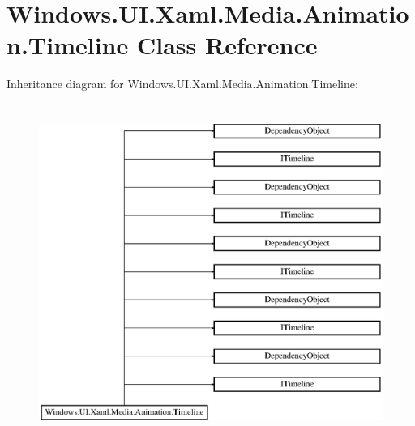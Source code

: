 \hypertarget{class_windows_1_1_u_i_1_1_xaml_1_1_media_1_1_animation_1_1_timeline}{}\section{Windows.\+U\+I.\+Xaml.\+Media.\+Animation.\+Timeline Class Reference}
\label{class_windows_1_1_u_i_1_1_xaml_1_1_media_1_1_animation_1_1_timeline}
Inheritance diagram for Windows.\+U\+I.\+Xaml.\+Media.\+Animation.\+Timeline\+:\begin{figure}[H]
\begin{center}
\leavevmode
\includegraphics[height=11.000000cm]{class_windows_1_1_u_i_1_1_xaml_1_1_media_1_1_animation_1_1_timeline}
\end{center}
\end{figure}
